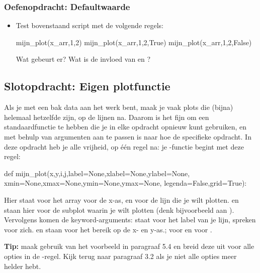 \documentclass[a4paper,11pt, fleqn]{article}
\begin{document}

\subsubsection*{Oefenopdracht: Defaultwaarde}
\begin{itemize}
	\item Test bovenstaand script met de volgende regels:
	\begin{python}
mijn_plot(x_arr,1,2)
mijn_plot(x_arr,1,2,True)
mijn_plot(x_arr,1,2,False)
	\end{python}
	Wat gebeurt er? Wat is de invloed van  en ?
\end{itemize}

\subsection{Slotopdracht: Eigen plotfunctie}
Als je met een bak data aan het werk bent, maak je vaak plots die (bijna) helemaal hetzelfde zijn, op de lijnen na. Daarom is het fijn om een standaardfunctie te hebben die je in elke opdracht opnieuw kunt gebruiken, en met behulp van argumenten aan te passen is naar hoe de specifieke opdracht. In deze opdracht heb je alle vrijheid, op \'e\'en regel na: je -functie begint met deze regel:

\begin{python}
def mijn_plot(x,y,i,j,label=None,xlabel=None,ylabel=None,
	      xmin=None,xmax=None,ymin=None,ymax=None,
	      legenda=False,grid=True):
\end{python}
Hier staat  voor het array voor de x-as, en  voor de lijn die je wilt plotten.  en  staan hier voor de subplot waarin je wilt plotten (denk bijvoorbeeld aan ). Vervolgens komen de keyword-arguments:  staat voor het label van je lijn,  spreken voor zich.  en  staan voor het bereik op de x- en y-as.;  voor  en  voor .

\bigbreak
{\bf Tip:} maak gebruik van het voorbeeld in paragraaf 5.4 en breid deze uit voor alle opties in de -regel. Kijk terug naar paragraaf 3.2 als je niet alle opties meer helder hebt.
\end{document}
